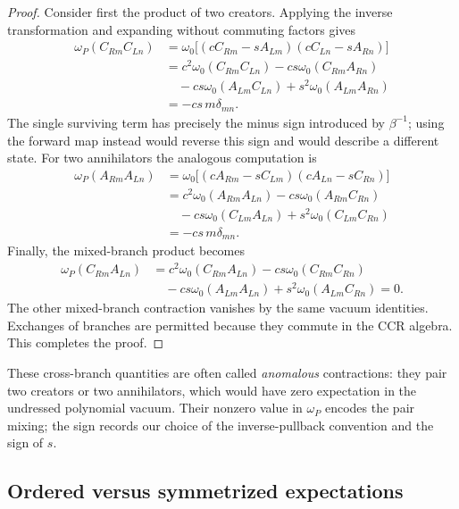 \begin{proof}
Consider first the product of two creators. Applying the inverse
transformation and expanding without commuting factors gives
\begin{align*}
 \omega_P(C_{Rm}C_{Ln})
 &=\omega_0\bigl[(cC_{Rm}-sA_{Lm})
                     (cC_{Ln}-sA_{Rn})\bigr]\\
 &=c^2\omega_0(C_{Rm}C_{Ln})
   -cs\omega_0(C_{Rm}A_{Rn})\\
 &\quad-cs\omega_0(A_{Lm}C_{Ln})
   +s^2\omega_0(A_{Lm}A_{Rn})\\
 &=-cs\,m\delta_{mn}.
\end{align*}
The single surviving term has precisely the minus sign introduced
by $\beta^{-1}$; using the forward map instead would reverse this
sign and would describe a different state.
For two annihilators the analogous computation is
\begin{align*}
 \omega_P(A_{Rm}A_{Ln})
 &=\omega_0\bigl[(cA_{Rm}-sC_{Lm})
                     (cA_{Ln}-sC_{Rn})\bigr]\\
 &=c^2\omega_0(A_{Rm}A_{Ln})
   -cs\omega_0(A_{Rm}C_{Rn})\\
 &\quad-cs\omega_0(C_{Lm}A_{Ln})
   +s^2\omega_0(C_{Lm}C_{Rn})\\
 &=-cs\,m\delta_{mn}.
\end{align*}
Finally, the mixed-branch product becomes
\begin{align*}
 \omega_P(C_{Rm}A_{Ln})
 &=c^2\omega_0(C_{Rm}A_{Ln})
   -cs\omega_0(C_{Rm}C_{Rn})\\
 &\quad-cs\omega_0(A_{Lm}A_{Ln})
   +s^2\omega_0(A_{Lm}C_{Rn})=0.
\end{align*}
The other mixed-branch contraction vanishes by the same vacuum
identities. Exchanges of branches are permitted because they commute
in the CCR algebra. This completes the proof.
\end{proof}

These cross-branch quantities are often called \emph{anomalous}
contractions: they pair two creators or two annihilators, which would
have zero expectation in the undressed polynomial vacuum. Their
nonzero value in $\omega_P$ encodes the pair mixing; the sign records
our choice of the inverse-pullback convention and the sign of $s$.

\subsection{Ordered versus symmetrized expectations}

